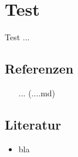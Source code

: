 \documentclass{sajzk}
\begin{document}
\section{Test} 
\label{filename}

Test ...

\subsection{Referenzen} 
\begin{itemize}
  \item [...](....md)
\end{itemize}

\subsection{Literatur} 

\begin{itemize}
  \item bla
\end{itemize}
\end{document}
